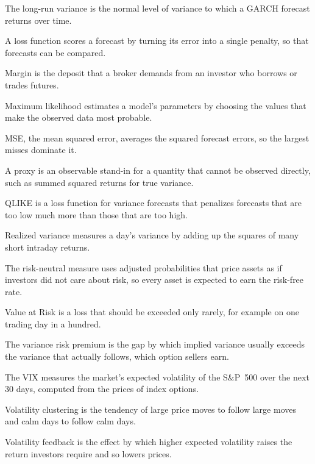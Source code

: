 \begin{keyterms}
\begin{description}[leftmargin=0pt, itemsep=2pt, parsep=0pt, font=\normalfont\bfseries\color{FEMaroon}]
  \item[Long-run variance.] The long-run variance is the normal level of variance to which a GARCH forecast returns over time.
  \item[Loss function.] A loss function scores a forecast by turning its error into a single penalty, so that forecasts can be compared.
  \item[Margin.] Margin is the deposit that a broker demands from an investor who borrows or trades futures.
  \item[Maximum likelihood.] Maximum likelihood estimates a model's parameters by choosing the values that make the observed data most probable.
  \item[MSE.] MSE, the mean squared error, averages the squared forecast errors, so the largest misses dominate it.
  \item[Proxy.] A proxy is an observable stand-in for a quantity that cannot be observed directly, such as summed squared returns for true variance.
  \item[QLIKE.] QLIKE is a loss function for variance forecasts that penalizes forecasts that are too low much more than those that are too high.
  \item[Realized variance.] Realized variance measures a day's variance by adding up the squares of many short intraday returns.
  \item[Risk-neutral measure.] The risk-neutral measure uses adjusted probabilities that price assets as if investors did not care about risk, so every asset is expected to earn the risk-free rate.
  \item[Value at Risk (VaR).] Value at Risk is a loss that should be exceeded only rarely, for example on one trading day in a hundred.
  \item[Variance risk premium.] The variance risk premium is the gap by which implied variance usually exceeds the variance that actually follows, which option sellers earn.
  \item[VIX.] The VIX measures the market's expected volatility of the S\&P~500 over the next 30 days, computed from the prices of index options.
  \item[Volatility clustering.] Volatility clustering is the tendency of large price moves to follow large moves and calm days to follow calm days.
  \item[Volatility feedback.] Volatility feedback is the effect by which higher expected volatility raises the return investors require and so lowers prices.
\end{description}
\end{keyterms}
